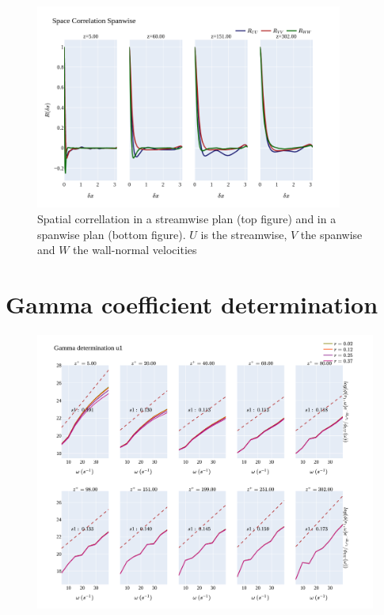 \documentclass[]{article}
\theoremstyle{plain}
\theoremstyle{remark}
\begin{document}
\begin{figure}[h!]
	\begin{center}
		\includegraphics[width=0.9\textwidth]{../output/channel_wrles_retau395/split_time/space_correlation/spanwise.png}
		\caption{Spatial correllation in a streamwise plan (top figure) and in a spanwise plan (bottom figure). $U$ is the streamwise, $V$ the spanwise and $W$ the wall-normal velocities}
	\end{center}
\end{figure}


\section{Gamma coefficient determination}

\begin{figure}[h!]
	\begin{center}
		\includegraphics[width=\textwidth]{../output/channel_wrles_retau395/split_time/gamma/gamma_u1_w_all.png}
	\end{center}
\end{figure}
\end{document}

